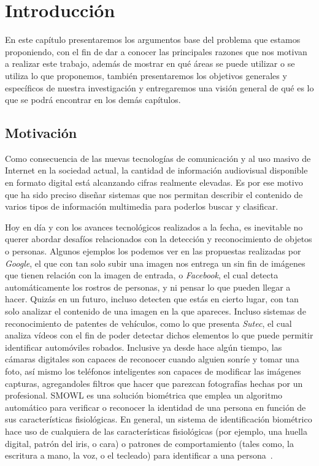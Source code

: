 \chapter[Introducción]{Introducción}\label{ch:capitulo1}
En este capítulo presentaremos los argumentos base del problema que estamos proponiendo, con el fin de dar a conocer las principales razones que nos motivan a realizar este trabajo, además de mostrar en qué áreas se puede utilizar o se utiliza lo que proponemos, también presentaremos los objetivos generales y específicos de nuestra investigación y entregaremos una visión general de qué es lo que se podrá encontrar en los demás capítulos.


\section{Motivación}\label{chsub:Motivación}

Como consecuencia de las nuevas tecnologías de comunicación y al uso masivo de Internet en la sociedad actual, la cantidad de información audiovisual disponible en formato digital está alcanzando cifras realmente elevadas. Es por ese motivo que ha sido preciso diseñar sistemas que nos permitan describir el contenido de varios tipos de información multimedia para poderlos buscar y clasificar.

Hoy en día y con los avances tecnológicos realizados a la fecha, es inevitable no querer abordar desafíos relacionados con la detección y reconocimiento de objetos o personas. Algunos ejemplos los podemos ver en las propuestas realizadas por \textit{Google}, el que con tan solo subir una imagen nos entrega un sin fin de imágenes que tienen relación con la imagen de entrada, o \textit{Facebook}, el cual detecta automáticamente los rostros de personas, y ni pensar lo que pueden llegar a hacer. Quizás en un futuro, incluso detecten que estás en cierto lugar, con tan solo analizar el contenido de una imagen en la que apareces. Incluso sistemas de reconocimiento de patentes de vehículos, como lo que presenta \textit{Sutec}, el cual analiza vídeos con el fin de poder detectar dichos elementos lo que puede permitir identificar automóviles robados. Inclusive ya desde hace algún tiempo, las cámaras digitales son capaces de reconocer cuando alguien sonríe y tomar una foto, así mismo los teléfonos inteligentes son capaces de modificar las imágenes capturas, agregandoles filtros que hacer que parezcan fotografías hechas por un profesional. SMOWL es una solución biométrica que emplea un algoritmo automático para verificar o reconocer la identidad de una persona en función de sus características fisiológicas. En general, un sistema de identificación biométrico hace uso de cualquiera de las características fisiológicas (por ejemplo, una huella digital, patrón del iris, o cara) o patrones de comportamiento (tales como, la escritura a mano, la voz, o el tecleado) para identificar a una persona~\cite{SMOWL}.

